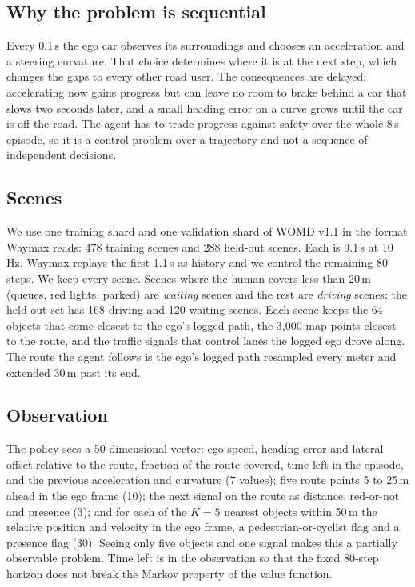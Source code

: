 \documentclass[conference]{IEEEtran}
\begin{document}
\subsection{Why the problem is sequential}
Every 0.1\,s the ego car observes its surroundings and chooses an acceleration and a
steering curvature. That choice determines where it is at the next step, which changes
the gaps to every other road user. The consequences are delayed: accelerating now gains
progress but can leave no room to brake behind a car that slows two seconds later, and
a small heading error on a curve grows until the car is off the road. The agent has to
trade progress against safety over the whole 8\,s episode, so it is a control problem
over a trajectory and not a sequence of independent decisions.

\subsection{Scenes}
We use one training shard and one validation shard of WOMD v1.1 in the format Waymax
reads: 478 training scenes and 288 held-out scenes. Each is 9.1\,s at 10\,Hz. Waymax
replays the first 1.1\,s as history and we control the remaining 80 steps. We keep every
scene. Scenes where the human covers less than 20\,m (queues, red lights, parked) are
\emph{waiting} scenes and the rest are \emph{driving} scenes; the held-out set has 168
driving and 120 waiting scenes. Each scene keeps the 64 objects that come closest to the
ego's logged path, the 3,000 map points closest to the route, and the traffic signals
that control lanes the logged ego drove along. The route the agent follows is the ego's
logged path resampled every meter and extended 30\,m past its end.

\subsection{Observation}
The policy sees a 50-dimensional vector: ego speed, heading error and lateral offset
relative to the route, fraction of the route covered, time left in the episode, and the
previous acceleration and curvature (7 values); five route points 5 to 25\,m ahead in the
ego frame (10); the next signal on the route as distance, red-or-not and presence (3);
and for each of the $K=5$ nearest objects within 50\,m the relative position and velocity
in the ego frame, a pedestrian-or-cyclist flag and a presence flag (30). Seeing only five
objects and one signal makes this a partially observable problem. Time left is in the
observation so that the fixed 80-step horizon does not break the Markov property of the
value function.
\end{document}
